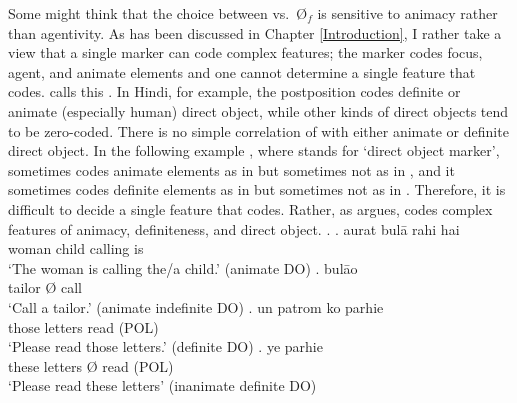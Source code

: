 Some might think that the choice between  vs.\ {\O$_{f}$} is sensitive to animacy rather than agentivity.
As has been discussed in Chapter \ref{Introduction}, I rather take a view that a single marker can code complex features;
the marker  codes focus, agent, and animate elements
and one cannot determine a single feature that  codes.
 calls this .
In Hindi,
for example,
the postposition  codes definite or animate (especially human) direct object,
while other kinds of direct objects tend to be zero-coded.
There is no simple correlation of  with either animate or definite direct object.
In the following example \Next,
where  stands for `direct object marker',
sometimes  codes animate elements as in \Next[a] but sometimes not as in \Next[c],
and it sometimes codes definite elements as in \Next[c] but sometimes not as in \Next[a,d].
Therefore,
it is difficult to decide a single feature that  codes.
Rather,
as  argues,
 codes complex features of animacy, definiteness, and direct object.
\ex.
 \ag. aurat   bul\={a} rahi hai \\
	woman child  calling  is \\
	`The woman is calling the/a child.' \hfill{(animate DO)}
 \bg.  \EM{\O} bul\={a}o \\
	tailor {\O} call \\
	`Call a tailor.' \hfill{(animate indefinite DO)}
 \bg. un patrom ko parhie \\
	those letters  read (POL) \\
	`Please read those letters.' \hfill{(definite DO)}
 \bg. ye  \EM{\O} parhie \\
	these letters {\O} read (POL) \\
	`Please read these letters' \hfill{(inanimate definite DO)}
\begin{flushright}
\cite[][p.\ 48]{mcgregor72}
\end{flushright}

